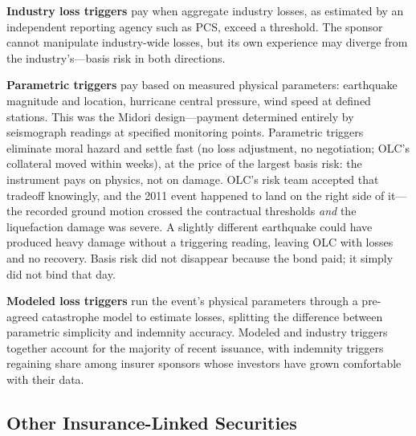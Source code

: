 \documentclass[11pt,openany]{book}
\begin{document}
\textbf{Industry loss triggers} pay when aggregate industry losses, as
estimated by an independent reporting agency such as PCS, exceed a threshold.
The sponsor cannot manipulate industry-wide losses, but its own experience
may diverge from the industry's---basis risk in both directions.

\textbf{Parametric triggers} pay based on measured physical parameters:
earthquake magnitude and location, hurricane central pressure, wind speed at
defined stations. This was the Midori design---payment determined entirely by
seismograph readings at specified monitoring points. Parametric triggers
eliminate moral hazard and settle fast (no loss adjustment, no negotiation;
OLC's collateral moved within weeks), at the price of the largest basis risk:
the instrument pays on physics, not on damage. OLC's risk team accepted that
tradeoff knowingly, and the 2011 event happened to land on the right side of
it---the recorded ground motion crossed the contractual thresholds \emph{and}
the liquefaction damage was severe. A slightly different earthquake could
have produced heavy damage without a triggering reading, leaving OLC with
losses and no recovery. Basis risk did not disappear because the bond paid;
it simply did not bind that day.

\textbf{Modeled loss triggers} run the event's physical parameters through a
pre-agreed catastrophe model to estimate losses, splitting the difference
between parametric simplicity and indemnity accuracy. Modeled and industry
triggers together account for the majority of recent issuance, with indemnity
triggers regaining share among insurer sponsors whose investors have grown
comfortable with their data.

\subsection{Other Insurance-Linked Securities}
\end{document}

